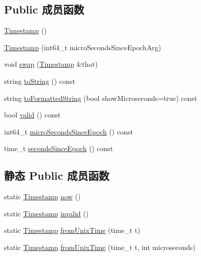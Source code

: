 \subsection*{Public 成员函数}
\begin{DoxyCompactItemize}
\item 
\hyperlink{classmuduo_1_1Timestamp_a3ccb273b45fb16b1b14de8a4c8b44e3b}{Timestamp} ()
\item 
\hyperlink{classmuduo_1_1Timestamp_a37c7ad2d5316b1c9c0e6e1686ad599ff}{Timestamp} (int64\+\_\+t micro\+Seconds\+Since\+Epoch\+Arg)
\item 
void \hyperlink{classmuduo_1_1Timestamp_aa405c6fb7c29a07e1924fa0b4d846638}{swap} (\hyperlink{classmuduo_1_1Timestamp}{Timestamp} \&that)
\item 
string \hyperlink{classmuduo_1_1Timestamp_a133cf5030cda633035ca97147356f2f9}{to\+String} () const
\item 
string \hyperlink{classmuduo_1_1Timestamp_ac8bf4663993962a4d68d4a6c44588e97}{to\+Formatted\+String} (bool show\+Microseconds=true) const
\item 
bool \hyperlink{classmuduo_1_1Timestamp_a315419f26d3c59fa143b49b90a019049}{valid} () const
\item 
int64\+\_\+t \hyperlink{classmuduo_1_1Timestamp_a8a0616b73c803b94f5c0e9d00fa96fb4}{micro\+Seconds\+Since\+Epoch} () const
\item 
time\+\_\+t \hyperlink{classmuduo_1_1Timestamp_a71e46e0dc3ff552a361dfe7dc32847b5}{seconds\+Since\+Epoch} () const
\end{DoxyCompactItemize}
\subsection*{静态 Public 成员函数}
\begin{DoxyCompactItemize}
\item 
static \hyperlink{classmuduo_1_1Timestamp}{Timestamp} \hyperlink{classmuduo_1_1Timestamp_a3bca3b2a36424e36b3d2c772fa7d5772}{now} ()
\item 
static \hyperlink{classmuduo_1_1Timestamp}{Timestamp} \hyperlink{classmuduo_1_1Timestamp_a1aa83f32d706090ef354b182460d27aa}{invalid} ()
\item 
static \hyperlink{classmuduo_1_1Timestamp}{Timestamp} \hyperlink{classmuduo_1_1Timestamp_aee5bf9a550a08f101f9fff5ab98f5f8b}{from\+Unix\+Time} (time\+\_\+t t)
\item 
static \hyperlink{classmuduo_1_1Timestamp}{Timestamp} \hyperlink{classmuduo_1_1Timestamp_a610b35a1215297acd5117d0006e64434}{from\+Unix\+Time} (time\+\_\+t t, int microseconds)
\end{DoxyCompactItemize}
